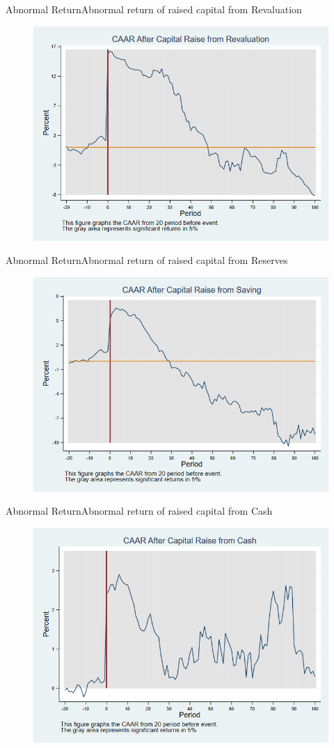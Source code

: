 \documentclass{beamer}
\begin{document}
	\begin{frame}{Abnormal Return}{Abnormal return of raised capital from Revaluation}
		\label{car_4factorRevaluation}
		\begin{figure}
			\centering
			\includegraphics[width=0.65\linewidth]{Output/car_4factorRevaluation.png}
			\label{fig:car_4factorRevaluation}
		\end{figure}
		
	\end{frame}
	
	
	\begin{frame}{Abnormal Return}{Abnormal return of raised capital from Reserves}
		\label{car_4factorSaving}
		\begin{figure}
			\centering
			\includegraphics[width=0.65\linewidth]{Output/car_4factorSaving.png}
			\label{fig:car_4factorSaving}
		\end{figure}
		
	\end{frame}
	
	
	\begin{frame}{Abnormal Return}{Abnormal return of raised capital from Cash}
		\label{car_4factorCash}
		\begin{figure}
			\centering
			\includegraphics[width=0.65\linewidth]{Output/car_4factorCash.png}
			\label{fig:car_4factorCash}
		\end{figure}
	\end{frame}
	
\end{document}
